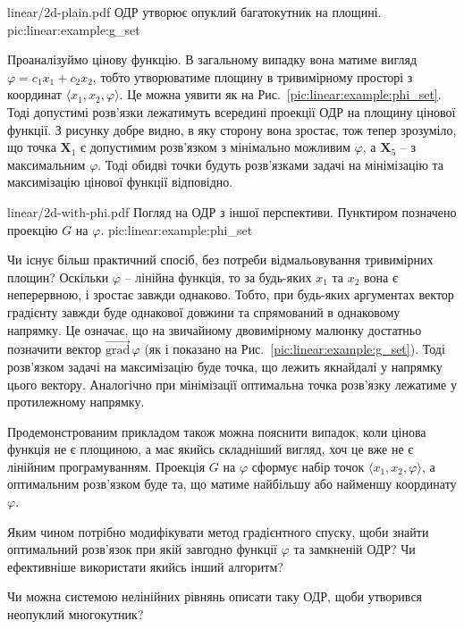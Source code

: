 \documentclass[\main/book.tex]{subfiles}
\begin{document}
\illustration
 {linear/2d-plain.pdf}
 {ОДР утворює опуклий багатокутник на площині.}
 {pic:linear:example:g_set}

Проаналізуймо цінову функцію. В загальному випадку вона матиме вигляд $\varphi = c_1 x_1 + c_2 x_2$, тобто утворюватиме площину в тривимірному просторі з координат $\langle x_1, x_2, \varphi \rangle$. Це можна уявити як на Рис.~\ref{pic:linear:example:phi_set}. Тоді допустимі розв'язки лежатимуть всередині проекції ОДР на площину цінової функції. З рисунку добре видно, в яку сторону вона зростає, тож тепер зрозуміло, що точка $\mathbf{X}_1$ є допустимим розв'язком з мінімально можливим $\varphi$, а $\mathbf{X}_5$ -- з максимальним $\varphi$. Тоді обидві точки будуть розв'язками задачі на мінімізацію та максимізацію цінової функції відповідно.

\illustration
 {linear/2d-with-phi.pdf}
 {Погляд на ОДР з іншої перспективи. Пунктиром позначено проекцію $G$ на $\varphi$.}
 {pic:linear:example:phi_set}

Чи існує більш практичний спосіб, без потреби відмальовування тривимірних площин? Оскільки $\varphi$ -- лінійна функція, то за будь-яких $x_1$ та $x_2$ вона є неперервною, і зростає завжди однаково. Тобто, при будь-яких аргументах вектор градієнту завжди буде однакової довжини та спрямований в однаковому напрямку. Це означає, що на звичайному двовимірному малюнку достатньо позначити вектор $\overrightarrow{\mathrm{grad}}\,\varphi$ (як і показано на Рис.~\ref{pic:linear:example:g_set}). Тоді розв'язком задачі на максимізацію буде точка, що лежить якнайдалі у напрямку цього вектору. Аналогічно при мінімізації оптимальна точка розв'язку лежатиме у протилежному напрямку.

\begin{note}
 Продемонстрованим прикладом також можна пояснити випадок, коли цінова функція не є площиною, а має якийсь складніший вигляд, хоч це вже не є лінійним програмуванням. Проекція $G$ на $\varphi$ сформує набір точок $\langle x_1, x_2, \varphi \rangle$, а оптимальним розв'язком буде та, що матиме найбільшу або найменшу координату $\varphi$.
\end{note}

\begin{question}
 Яким чином потрібно модифікувати метод градієнтного спуску, щоби знайти оптимальний розв'язок при якій завгодно функції $\varphi$ та замкненій ОДР? Чи ефективніше використати якийсь інший алгоритм?
\end{question}

\begin{question}
 Чи можна системою нелінійних рівнянь описати таку ОДР, щоби утворився неопуклий многокутник?
\end{question}
\end{document}
